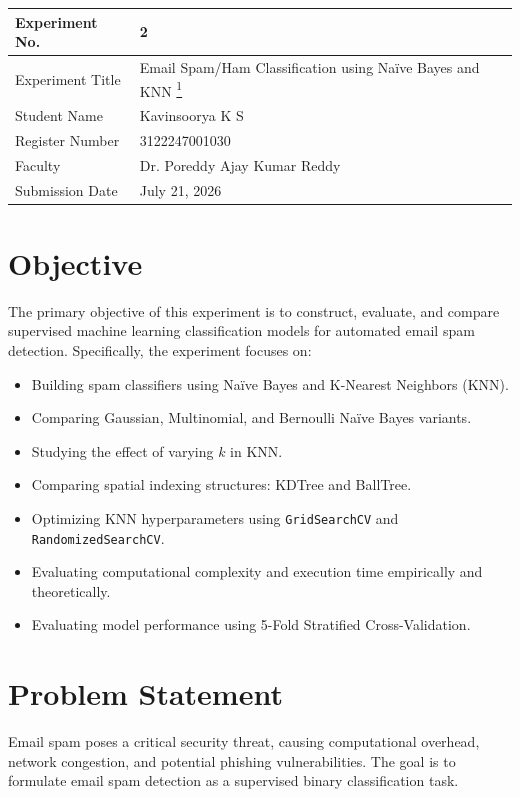 \documentclass[12pt,a4paper]{article}
\begin{document}
\begin{tabular}{|p{4cm}|p{11cm}|}
\hline
Experiment No. & 2 \\ \hline
Experiment Title & Email Spam/Ham Classification using Na\"ive Bayes and KNN \href{https://github.com/Kavin-ks/Machine-Learning-Projects}{\textsuperscript{1}}\\ \hline
Student Name & Kavinsoorya K S \\ \hline
Register Number & 3122247001030 \\ \hline
Faculty & Dr. Poreddy Ajay Kumar Reddy \\ \hline
Submission Date & July 21, 2026 \\ \hline
\end{tabular}

\vspace{0.5cm}

\section{Objective}
The primary objective of this experiment is to construct, evaluate, and compare supervised machine learning classification models for automated email spam detection. Specifically, the experiment focuses on:
\begin{itemize}
    \item Building spam classifiers using Na\"ive Bayes and K-Nearest Neighbors (KNN).
    \item Comparing Gaussian, Multinomial, and Bernoulli Na\"ive Bayes variants.
    \item Studying the effect of varying $k$ in KNN.
    \item Comparing spatial indexing structures: KDTree and BallTree.
    \item Optimizing KNN hyperparameters using \texttt{GridSearchCV} and \texttt{RandomizedSearchCV}.
    \item Evaluating computational complexity and execution time empirically and theoretically.
    \item Evaluating model performance using 5-Fold Stratified Cross-Validation.
\end{itemize}

\section{Problem Statement}
Email spam poses a critical security threat, causing computational overhead, network congestion, and potential phishing vulnerabilities. The goal is to formulate email spam detection as a supervised binary classification task.
\end{document}
